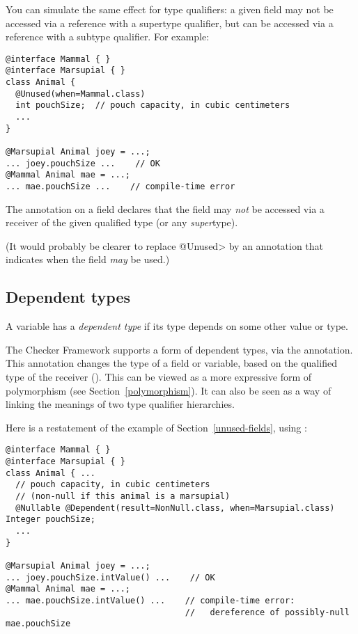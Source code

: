 You can simulate
the same effect for type qualifiers:  a given field may not be accessed via
a reference with a supertype qualifier, but can be accessed via a reference
with a subtype qualifier.
For example:

\begin{Verbatim}
@interface Mammal { }
@interface Marsupial { }
class Animal {
  @Unused(when=Mammal.class)
  int pouchSize;  // pouch capacity, in cubic centimeters
  ...
}

@Marsupial Animal joey = ...;
... joey.pouchSize ...    // OK
@Mammal Animal mae = ...;
... mae.pouchSize ...    // compile-time error
\end{Verbatim}

The  annotation
on a field declares that the field may \emph{not} be accessed via a receiver of
the given qualified type (or any \emph{super}type).

(It would probably be clearer to replace \<@Unused> by an annotation that
indicates when the field \emph{may} be used.)


\subsection{Dependent types\label{dependent-types}}

A variable has a \emph{dependent type} if its type depends on some other
value or type.

The Checker Framework supports a form of dependent types, via the
 annotation.
This annotation changes the type of a field or variable, based on the
qualified type of the receiver ().  This can be viewed as a more
expressive form of polymorphism (see Section~\ref{polymorphism}).  It can
also be seen as a way of linking the meanings of two type qualifier
hierarchies.

Here is a restatement of the example of Section~\ref{unused-fields}, using
:

\begin{Verbatim}
@interface Mammal { }
@interface Marsupial { }
class Animal { ...
  // pouch capacity, in cubic centimeters
  // (non-null if this animal is a marsupial)
  @Nullable @Dependent(result=NonNull.class, when=Marsupial.class) Integer pouchSize;
  ...
}

@Marsupial Animal joey = ...;
... joey.pouchSize.intValue() ...    // OK
@Mammal Animal mae = ...;
... mae.pouchSize.intValue() ...    // compile-time error:
                                    //   dereference of possibly-null mae.pouchSize
\end{Verbatim}

